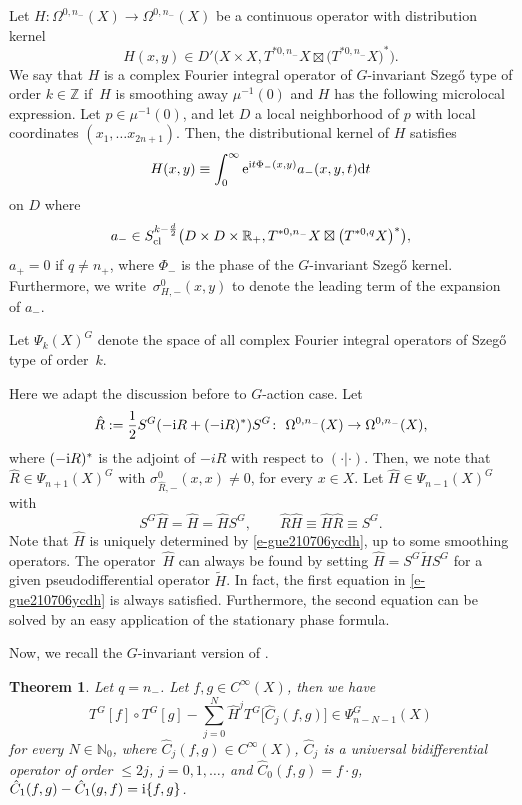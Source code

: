 \documentclass[pdftex]{sigma}
\numberwithin{equation}{section}
\newtheorem{Theorem}{Theorem}[section]
\newcommand{\To}{\rightarrow}
\begin{document}
 \begin{Definition}\label{d-gue210803yyd}
 	Let $H\colon \Omega^{0,n_-}(X)\To\Omega^{0,n_-}(X)$ be a continuous operator with distribution kernel \[H(x,y)\in{D}'\bigl(X\times X,T^{*0,n_-}X\boxtimes\bigl(T^{*0,n_-}X\bigr)^*\bigr) .\]
 	We say that $H$ is a complex Fourier integral operator of $G$-invariant Szeg\H{o} type of order ${k\in\mathbb Z}$ if~$H$ is smoothing away $\mu^{-1}(0)$ and $H$ has the following microlocal expression. Let $p\in \mu^{-1}(0)$, and let $D$ a local neighborhood of $p$ with local coordinates $(x_1,\dots x_{2n+1})$. Then, the distributional kernel of $H$ satisfies
 	\[H(x,y)\equiv \int^\infty_0 {\rm e}^{{\rm i} t \Phi_-(x,y)}a_-(x, y, t) {\rm d}t\]
 	on $D$ where \[a_-\in S^{k-\frac{d}{2}}_{{\rm cl }}\bigl(D\times D\times\mathbb{R}_+,T^{*0,n_-}X\boxtimes\bigl(T^{*0,q}X\bigr)^*\bigr) ,\] $a_+=0$ if $q\neq n_+$, where $\Phi_-$ is the phase of the $G$-invariant Szeg\H{o} kernel. Furthermore, we write~${\sigma^0_{H,-}(x,y)}$ to denote the leading term of the expansion of $a_{-}$.
 	
 	Let $\Psi_k(X)^G$ denote the space of all complex Fourier integral operators of Szeg\H{o} type of order~$k$.
 \end{Definition}

Here we adapt the discussion before \cite[Theorem 4.9]{gh} to $G$-action case. Let
\[%
	\hat R:=\frac{1}{2}S^{G}(-{\rm i}R+(-{\rm i}R)^*)S^{G}\colon\ \Omega^{0,n_-}(X)\To\Omega^{0,n_-}(X),
\]
where $(-{\rm i}R)^*$ is the adjoint of $-iR$ with respect to $( \cdot | \cdot )$.
Then, we note that $\hat R\in\Psi_{n+1}(X)^G$ with $\sigma^0_{\hat R,-}(x,x)\neq0$, for every $x\in X$.
Let $\hat H\in\Psi_{n-1}(X)^G$ with
\begin{equation}\label{e-gue210706ycdh}
		S^G\hat H=\hat H=\hat HS^G ,\qquad
		\hat R\hat H\equiv \hat H\hat R\equiv S^G .
\end{equation}
Note that $\hat H$ is uniquely determined by \eqref{e-gue210706ycdh}, up to some smoothing operators. The operator~$\hat H$ can always be found by setting $\hat H= S^G \tilde{H} S^G$ for a given pseudodifferential operator $\tilde{H}$. In fact, the first equation in \eqref{e-gue210706ycdh} is always satisfied. Furthermore, the second equation can be solved by an easy application of the stationary phase formula.

Now, we recall the $G$-invariant version of \cite[Theorem 4.9]{gh}.

\begin{Theorem}\label{t-gue210706ycdg}
	Let $q=n_-$.
	Let $f, g\in{C}^\infty(X)$, then we have
	\[
		T^G[f]\circ T^G[g]-\sum^N_{j=0}\hat H^j T^G\big[{\hat C_{j}(f,g)}\big]\in\Psi_{n-N-1}^G(X)
	\]
	for every $N\in\mathbb N_0$, where $\hat C_{j}(f,g)\in{C}^\infty(X)$, $\hat C_{j}$ is a universal bidifferential operator of order $\leq 2j$, $j=0,1,\dots$, and
$\hat C_{0}(f,g)=f\cdot g$, $
			\hat C_{1}(f,g)-\hat C_{1}(g,f)= {\rm i} \{f,g\}$.
\end{Theorem}
\end{document}

